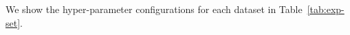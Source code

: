 \documentclass{article}
\theoremstyle{plain}
\theoremstyle{definition}
\theoremstyle{remark}
\begin{document}




We show the hyper-parameter configurations for each dataset in Table~\ref{tab:exp-set}. 

\end{document}
